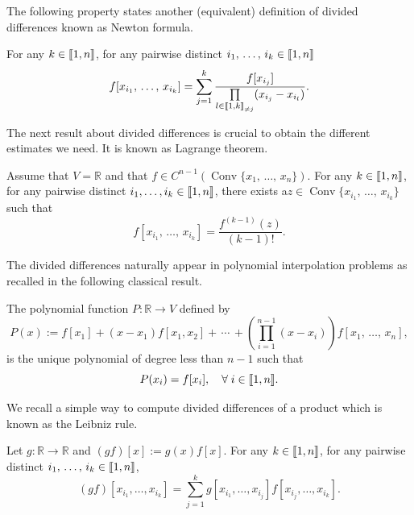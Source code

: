 \documentclass[10pt]{amsart}
\theoremstyle{definition}\newtheorem{defi}[theo]{Definition}\newtheorem{rema}[theo]{Remark}\newtheorem{exam}[theo]{Example}\newtheorem{exem}[theo]{Example}\newtheorem{nota}[theo]{Notation}
\DeclareMathOperator{\Conv}{Conv}
\newcommand{\llbracket}{\mathopen{[\mkern -2.7mu[}}
\newcommand{\rrbracket}{\mathclose{]\mkern -2.7mu]}}
\newcommand{\inter}[2]{\llbracket #1,#2 \rrbracket}
\newcommand{\interexclu}[3]{\llbracket #1,#2\rrbracket_{\neq #3}}
\newcommand{\R}{\mathbb{R}}
\let\oldforall\forall
\renewcommand*{\forall}{\mathrel{\oldforall}}
\begin{document}
The following property states another (equivalent) definition of divided differences known as Newton formula.

\begin{prop}\label{Prop:DifferencesDiviseesNewton}
For any $k \in \inter{1}{n}$, for any pairwise distinct $i_1,\,\dots,\,i_k \linebreak \in \inter{1}{n}$
\[
f[x_{i_1},\,\dots,\,x_{i_k}] = \sum_{j=1}^k \frac{f[x_{i_j}]}{\prod\limits_{l\in \interexclu{1}{k}{j}} (x_{i_j}- x_{i_l})}.
\]
\end{prop}

The next result about divided differences is crucial to obtain the different estimates we need. It is known as Lagrange theorem.

\begin{prop}\label{Prop:DifferencesDiviseesLagrange}
Assume that $V\!=\!\R$ and that $f \in C^{n-1} \left(\Conv \{ x_1,\,\dots,\,x_n \} \right)$. For any $k \in \inter{1}{n}$, for any pairwise distinct $i_1, \dots, i_k \in \inter{1}{n} $, there exists a\linebreak$z \in \Conv \{ x_{i_1},\,\dots,\,x_{i_k} \}$ such that
\[
f[x_{i_1},\,\dots,\,x_{i_k}] = \frac{f^{(k-1)}(z)}{(k-1)!}.
\]
\end{prop}


The divided differences naturally appear in polynomial interpolation problems as recalled in the following classical result.
\begin{prop}
The polynomial function $P:\R\to V$ defined by
\begin{equation}\label{lagrange_poly}
P(x) := f[x_1] + (x-x_1) f[x_1,x_2] +\,\dotsm \,+ \left(\prod_{i=1}^{n-1} (x-x_i) \right) f[x_1,\,\dotsc,\,x_n],
\end{equation}
is the unique polynomial of degree less than $n-1$ such that
\begin{equation}\label{interpolation_property}
P(x_i)=f[x_i], \quad \forall i\in \inter{1}{n}.
\end{equation}
\end{prop}

We recall a simple way to compute divided differences of a product which is known as the Leibniz rule.

\begin{prop}\label{Prop:DifferencesDiviseesLeibniz}
Let $g : \R \to \R$ and $(gf)[x] := g(x) f[x]$. For any $k \in \inter{1}{n}$, for any pairwise distinct $i_1,\,\dots,\,i_k \in \inter{1}{n}$,
\[
(gf)[x_{i_1}, \dots, x_{i_k}] = \sum_{j=1}^k g[x_{i_1}, \dots, x_{i_j}] f[x_{i_j}, \dots, x_{i_k}].
\]
\end{prop}
\end{document}
